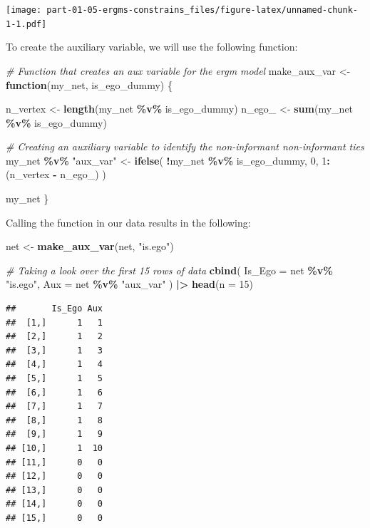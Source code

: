 \documentclass[
]{book}
\newenvironment{Shaded}{\begin{snugshade}}{\end{snugshade}}
\newcommand{\AttributeTok}[1]{\textcolor[rgb]{0.13,0.29,0.53}{#1}}
\newcommand{\CommentTok}[1]{\textcolor[rgb]{0.56,0.35,0.01}{\textit{#1}}}
\newcommand{\ControlFlowTok}[1]{\textcolor[rgb]{0.13,0.29,0.53}{\textbf{#1}}}
\newcommand{\DecValTok}[1]{\textcolor[rgb]{0.00,0.00,0.81}{#1}}
\newcommand{\FunctionTok}[1]{\textcolor[rgb]{0.13,0.29,0.53}{\textbf{#1}}}
\newcommand{\NormalTok}[1]{#1}
\newcommand{\OtherTok}[1]{\textcolor[rgb]{0.56,0.35,0.01}{#1}}
\newcommand{\SpecialCharTok}[1]{\textcolor[rgb]{0.81,0.36,0.00}{\textbf{#1}}}
\newcommand{\StringTok}[1]{\textcolor[rgb]{0.31,0.60,0.02}{#1}}
\begin{document}
\texttt{[image: part-01-05-ergms-constrains\_files/figure-latex/unnamed-chunk-1-1.pdf]}

To create the auxiliary variable, we will use the following function:

\begin{Shaded}
\begin{Highlighting}[]
\CommentTok{\# Function that creates an aux variable for the ergm model}
\NormalTok{make\_aux\_var }\OtherTok{\textless{}{-}} \ControlFlowTok{function}\NormalTok{(my\_net, is\_ego\_dummy) \{}
  
\NormalTok{  n\_vertex }\OtherTok{\textless{}{-}} \FunctionTok{length}\NormalTok{(my\_net }\SpecialCharTok{\%v\%}\NormalTok{ is\_ego\_dummy)}
\NormalTok{  n\_ego\_   }\OtherTok{\textless{}{-}} \FunctionTok{sum}\NormalTok{(my\_net }\SpecialCharTok{\%v\%}\NormalTok{ is\_ego\_dummy)}
  
  \CommentTok{\# Creating an auxiliary variable to identify the non{-}informant non{-}informant ties}
\NormalTok{  my\_net }\SpecialCharTok{\%v\%} \StringTok{"aux\_var"} \OtherTok{\textless{}{-}} \FunctionTok{ifelse}\NormalTok{(}
    \SpecialCharTok{!}\NormalTok{my\_net }\SpecialCharTok{\%v\%}\NormalTok{ is\_ego\_dummy, }\DecValTok{0}\NormalTok{, }\DecValTok{1}\SpecialCharTok{:}\NormalTok{(n\_vertex }\SpecialCharTok{{-}}\NormalTok{ n\_ego\_)}
\NormalTok{    )}

\NormalTok{  my\_net}
\NormalTok{\}}
\end{Highlighting}
\end{Shaded}

Calling the function in our data results in the following:

\begin{Shaded}
\begin{Highlighting}[]
\NormalTok{net }\OtherTok{\textless{}{-}} \FunctionTok{make\_aux\_var}\NormalTok{(net, }\StringTok{"is.ego"}\NormalTok{)}

\CommentTok{\# Taking a look over the first 15 rows of data}
\FunctionTok{cbind}\NormalTok{(}
  \AttributeTok{Is\_Ego =}\NormalTok{ net }\SpecialCharTok{\%v\%} \StringTok{"is.ego"}\NormalTok{,}
  \AttributeTok{Aux    =}\NormalTok{ net }\SpecialCharTok{\%v\%} \StringTok{"aux\_var"}  
\NormalTok{) }\SpecialCharTok{|\textgreater{}} \FunctionTok{head}\NormalTok{(}\AttributeTok{n =} \DecValTok{15}\NormalTok{)}
\end{Highlighting}
\end{Shaded}

\begin{verbatim}
##       Is_Ego Aux
##  [1,]      1   1
##  [2,]      1   2
##  [3,]      1   3
##  [4,]      1   4
##  [5,]      1   5
##  [6,]      1   6
##  [7,]      1   7
##  [8,]      1   8
##  [9,]      1   9
## [10,]      1  10
## [11,]      0   0
## [12,]      0   0
## [13,]      0   0
## [14,]      0   0
## [15,]      0   0
\end{verbatim}
\end{document}
